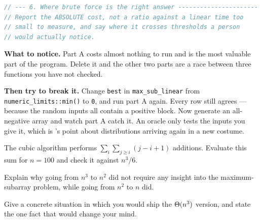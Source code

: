 \begin{lab}
\begin{lstlisting}[language=C++]
// --- 6. Where brute force is the right answer ----------------------
// Report the ABSOLUTE cost, not a ratio against a linear time too
// small to measure, and say where it crosses thresholds a person
// would actually notice.
\end{lstlisting}

\textbf{What to notice.} Part A costs almost nothing to run and is the most
valuable part of the program. Delete it and the other two parts are a race
between three functions you have not checked.

\smallskip
\textbf{Then try to break it.} Change \texttt{best} in
\texttt{max\_sub\_linear} from \texttt{numeric\_limits::min()} to \texttt{0},
and run part A again. Every row still agrees --- because the random inputs all
contain a positive block. Now generate an all-negative array and watch part A
catch it. An oracle only tests the inputs you give it, which is
's point about distributions arriving again in a new costume.
\end{lab}

\begin{checkpoint}
\begin{tightnum}
  \item The cubic algorithm performs $\sum_{i}\sum_{j\ge i}(j-i+1)$ additions.
        Evaluate this sum for $n = 100$ and check it against $n^{3}/6$.
  \item Explain why going from $n^{3}$ to $n^{2}$ did not require any insight
        into the maximum-subarray problem, while going from $n^{2}$ to $n$ did.
  \item Give a concrete situation in which you would ship the $\Theta(n^{3})$
        version, and state the one fact that would change your mind.
\end{tightnum}
\end{checkpoint}

